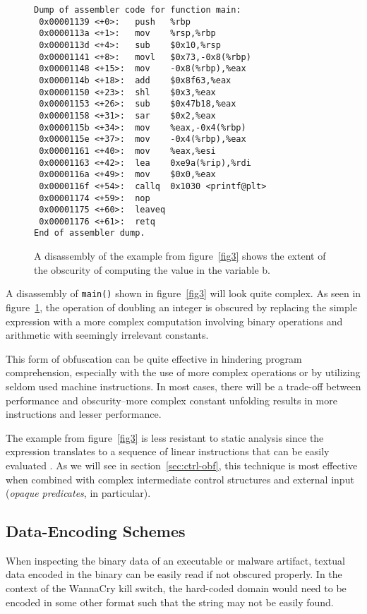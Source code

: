 \documentclass[conference]{IEEEtran}
\begin{document}
\begin{figure}[h]
\begin{lstlisting}[basicstyle=\footnotesize]
Dump of assembler code for function main:
 0x00001139 <+0>:   push   %rbp
 0x0000113a <+1>:   mov    %rsp,%rbp
 0x0000113d <+4>:   sub    $0x10,%rsp
 0x00001141 <+8>:   movl   $0x73,-0x8(%rbp)
 0x00001148 <+15>:  mov    -0x8(%rbp),%eax
 0x0000114b <+18>:  add    $0x8f63,%eax
 0x00001150 <+23>:  shl    $0x3,%eax
 0x00001153 <+26>:  sub    $0x47b18,%eax
 0x00001158 <+31>:  sar    $0x2,%eax
 0x0000115b <+34>:  mov    %eax,-0x4(%rbp)
 0x0000115e <+37>:  mov    -0x4(%rbp),%eax
 0x00001161 <+40>:  mov    %eax,%esi
 0x00001163 <+42>:  lea    0xe9a(%rip),%rdi
 0x0000116a <+49>:  mov    $0x0,%eax
 0x0000116f <+54>:  callq  0x1030 <printf@plt>
 0x00001174 <+59>:  nop
 0x00001175 <+60>:  leaveq 
 0x00001176 <+61>:  retq   
End of assembler dump.
\end{lstlisting}
\caption{A disassembly of the example from figure~\ref{fig3} shows the extent of the obscurity of computing the value in the variable b.}
\label{fig4}
\end{figure}

A disassembly of \texttt{main()} shown in figure~\ref{fig3} will look quite complex. As seen in figure~\ref{fig4}, the operation of doubling an integer is obscured by replacing the simple expression with a more complex computation involving binary operations and arithmetic with seemingly irrelevant constants.

This form of obfuscation can be quite effective in hindering program comprehension, especially with the use of more complex operations or by utilizing seldom used machine instructions. In most cases, there will be a trade-off between performance and obscurity--more complex constant unfolding results in more instructions and lesser performance.

The example from figure~\ref{fig3} is less resistant to static analysis since the expression translates to a sequence of linear instructions that can be easily evaluated \cite{b6}. As we will see in section~\ref{sec:ctrl-obf}, this technique is most effective when combined with complex intermediate control structures and external input (\textit{opaque predicates}, in particular).

\subsection{Data-Encoding Schemes}
When inspecting the binary data of an executable or malware artifact, textual data encoded in the binary can be easily read if not obscured properly. In the context of the WannaCry kill switch, the hard-coded domain would need to be encoded in some other format such that the string may not be easily found.
\end{document}
